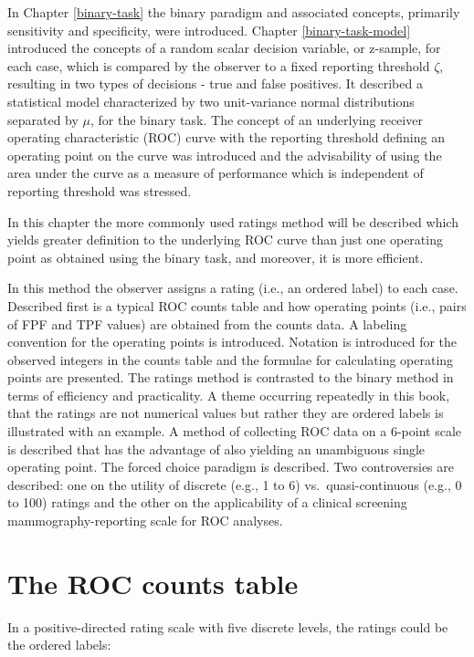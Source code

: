 \documentclass[
]{book}
\begin{document}
In Chapter \ref{binary-task} the binary paradigm and associated concepts, primarily sensitivity and specificity, were introduced. Chapter \ref{binary-task-model} introduced the concepts of a random scalar decision variable, or z-sample, for each case, which is compared by the observer to a fixed reporting threshold \(\zeta\), resulting in two types of decisions - true and false positives. It described a statistical model characterized by two unit-variance normal distributions separated by \(\mu\), for the binary task. The concept of an underlying receiver operating characteristic (ROC) curve with the reporting threshold defining an operating point on the curve was introduced and the advisability of using the area under the curve as a measure of performance which is independent of reporting threshold was stressed.

In this chapter the more commonly used ratings method will be described which yields greater definition to the underlying ROC curve than just one operating point as obtained using the binary task, and moreover, it is more efficient.

In this method the observer assigns a rating (i.e., an ordered label) to each case. Described first is a typical ROC counts table and how operating points (i.e., pairs of FPF and TPF values) are obtained from the counts data. A labeling convention for the operating points is introduced. Notation is introduced for the observed integers in the counts table and the formulae for calculating operating points are presented. The ratings method is contrasted to the binary method in terms of efficiency and practicality. A theme occurring repeatedly in this book, that the ratings are not numerical values but rather they are ordered labels is illustrated with an example. A method of collecting ROC data on a 6-point scale is described that has the advantage of also yielding an unambiguous single operating point. The forced choice paradigm is described. Two controversies are described: one on the utility of discrete (e.g., 1 to 6) vs.~quasi-continuous (e.g., 0 to 100) ratings and the other on the applicability of a clinical screening mammography-reporting scale for ROC analyses.

\hypertarget{ratings-paradigm-roc-counts-table}{%
\section{The ROC counts table}\label{ratings-paradigm-roc-counts-table}}

In a positive-directed rating scale with five discrete levels, the ratings could be the ordered labels:
\end{document}
